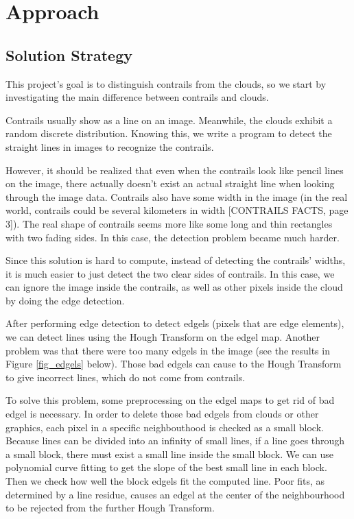 \chapter{Approach}

\section{Solution Strategy} 

This project’s goal is to distinguish contrails from the clouds, so we start 
by investigating the main difference between contrails and clouds. 

Contrails usually show as a line on an image. Meanwhile, the clouds 
exhibit a random discrete distribution. Knowing this, we write a program 
to detect the straight lines in images to recognize the contrails. 

However, it should be realized that even when the contrails look like pencil 
lines on the image, there actually doesn’t exist an actual straight line 
when looking through the image data. Contrails also have some width in 
the image (in the real world, contrails could be several kilometers in width 
[CONTRAILS FACTS, page 3]). The real shape of contrails seems more like 
some long and thin rectangles with two fading sides. In this case, the 
detection problem became much harder. 

Since this solution is hard to compute, instead of detecting the contrails’ widths, 
it is much easier to just detect the two clear sides of contrails. In this case, 
we can ignore the image inside the contrails, as well as other pixels inside 
the cloud by doing the edge detection.

After performing edge detection to detect edgels (pixels that are edge elements), 
we can detect lines using the Hough Transform on the edgel map. Another problem 
was that there were too many edgels in the image (see the results in
Figure \ref{fig_edgels} below). Those bad edgels can cause to the Hough Transform 
to give incorrect lines, which do not come from contrails.

To solve this problem, some preprocessing on the edgel maps to get rid of 
bad edgel is necessary. In order to delete those bad edgels from clouds 
or other graphics, each pixel in a specific neighbouthood is
checked as a small block. Because lines can be divided into an infinity of
small lines, if a line goes through a small block, there must exist a small 
line inside the small block. We can use polynomial curve fitting to get 
the slope of the best small line in each block. Then we check how well 
the block edgels fit the computed line. Poor fits, as determined by a 
line residue, causes an edgel at the center of the neighbourhood
to be rejected from the further Hough Transform.

